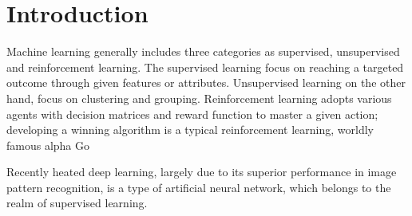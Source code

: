 \section{Introduction}

Machine learning generally includes three categories as supervised, unsupervised and reinforcement learning. The supervised learning focus on reaching a targeted outcome through given features or attributes. Unsupervised learning on the other hand, focus on clustering and grouping. Reinforcement learning adopts various agents with decision matrices and reward function to master a given action; developing a winning algorithm is a typical reinforcement learning, worldly famous alpha Go
\par
Recently heated deep learning, largely due to its superior performance in image pattern recognition, is a type of artificial neural network, which belongs to the realm of supervised learning. 
